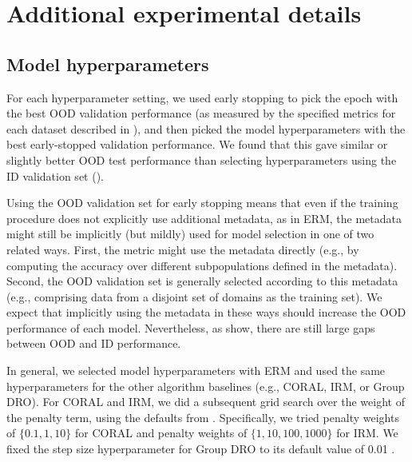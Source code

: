 \section{Additional experimental details}\label{sec:experiments}

\subsection{Model hyperparameters}\label{sec:experiments_id_vs_ood}
For each hyperparameter setting, we used early stopping to pick the epoch with the best OOD validation performance (as measured by the specified metrics for each dataset described in ), and then picked the model hyperparameters with the best early-stopped validation performance.
We found that this gave similar or slightly better OOD test performance than selecting hyperparameters using the ID validation set ().

Using the OOD validation set for early stopping means that even if the training procedure does not explicitly use additional metadata, as in ERM, the metadata might still be implicitly (but mildly) used for model selection in one of two related ways. First, the metric might use the metadata directly (e.g., by computing the accuracy over different subpopulations defined in the metadata). Second, the OOD validation set is generally selected according to this metadata (e.g., comprising data from a disjoint set of domains as the training set).
We expect that implicitly using the metadata in these ways should increase the OOD performance of each model. Nevertheless, as  show, there are still large gaps between OOD and ID performance.

In general, we selected model hyperparameters with ERM and used the same hyperparameters for the other algorithm baselines (e.g., CORAL, IRM, or Group DRO).
For CORAL and IRM, we did a subsequent grid search over the weight of the penalty term,
using the defaults from \citet{gulrajani2020search}. Specifically, we tried penalty weights of $\{0.1, 1, 10\}$ for CORAL and penalty weights of $\{1, 10, 100, 1000\}$ for IRM.
We fixed the step size hyperparameter for Group DRO to its default value of 0.01 \citep{sagawa2020group}.

